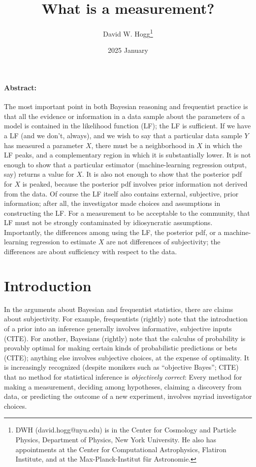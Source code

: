\documentclass{article}
\title{\bfseries
What is a measurement?}
\author{David W. Hogg\footnote{%
DWH (david.hogg@nyu.edu) is in the Center for Cosmology and Particle Physics, Department of Physics, New York University.
He also has appointments at the Center for Computational Astrophysics, Flatiron Institute, and at the Max-Planck-Institut f\"ur Astronomie.}}
\date{2025 January}
\begin{document}
\maketitle\thispagestyle{empty}

\paragraph{Abstract:}
The most important point in both Bayesian reasoning and frequentist practice is that all the evidence or information in a data sample about the parameters of a model is contained in the likelihood function (LF); the LF is sufficient.
If we have a LF (and we don't, always), and we wish to say that a particular data sample $Y$ has measured a parameter $X$, there must be a neighborhood in $X$ in which the LF peaks, and a complementary region in which it is substantially lower.
It is not enough to show that a particular estimator (machine-learning regression output, say) returns a value for $X$.
It is also not enough to show that the posterior pdf for $X$ is peaked, because the posterior pdf involves prior information not derived from the data.
Of course the LF itself also contains external, subjective, prior information; after all, the investigator made choices and assumptions in constructing the LF.
For a measurement to be acceptable to the community, that LF must not be strongly contaminated by idiosyncratic assumptions.
Importantly, the differences among using the LF, the posterior pdf, or a machine-learning regression to estimate $X$ are not differences of subjectivity; the differences are about sufficiency with respect to the data.

\section{Introduction}\label{sec:intro}
In the arguments about Bayesian and frequentist statistics, there are claims about subjectivity.
For example, frequentists (rightly) note that the introduction of a prior into an inference generally involves informative, subjective inputs (CITE).
For another, Bayesians (rightly) note that the calculus of probability is provably optimal for making certain kinds of probabilistic predictions or bets (CITE); anything else involves subjective choices, at the expense of optimality.
It is increasingly recognized (despite monikers such as ``objective Bayes''; CITE) that no method for statistical inference is \emph{objectively correct}:
Every method for making a measurement, deciding among hypotheses, claiming a discovery from data, or predicting the outcome of a new experiment, involves myriad investigator choices.
\end{document}
